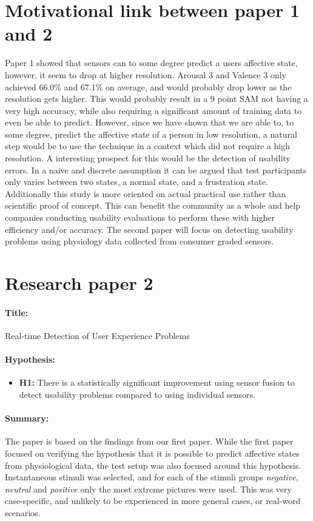 \section{Motivational link between paper 1 and 2}
Paper 1 showed that sensors can to some degree predict a users affective state, however, it seem to drop at higher resolution. 
Arousal 3 and Valence 3 only achieved 66.0\% and 67.1\% on average, and would probably drop lower as the resolution gets higher. 
This would probably result in a 9 point SAM not having a very high accuracy, while also requiring a significant amount of training data to even be able to predict.
However, since we have shown that we are able to, to some degree, predict the affective state of a person in low resolution, a natural step would be to use the technique in a context which did not require a high resolution. 
A interesting prospect for this would be the detection of usability errors.
In a naive and discrete assumption it can be argued that test participants only varies between two states, a normal state, and a frustration state.
Additionally this study is more oriented on actual practical use rather than scientific proof of concept. 
This can benefit the community as a whole and help companies conducting usability evaluations to perform these with higher efficiency and/or accuracy.
The second paper will focus on detecting usability problems using physiology data collected from consumer graded sensors.

\section{Research paper 2}
\paragraph{Title:}
Real-time Detection of User Experience Problems
\paragraph{Hypothesis:}
\begin{itemize}
    \item \textbf{H1:} There is a statistically significant improvement using sensor fusion to detect usability problems compared to using individual sensors.
\end{itemize}
\paragraph{Summary:}
The paper is based on the findings from our first paper. While the first paper focused on verifying the hypothesis that
it is possible to predict affective states from physiological data, the test setup was also focused around this
hypothesis.  Instantaneous stimuli was selected, and for each of the stimuli groups \textit{negative}, \textit{neutral}
and \textit{positive} only the most extreme pictures were used.  This was very case-specific, and unlikely to be
experienced in more general cases, or real-word scenarios.

